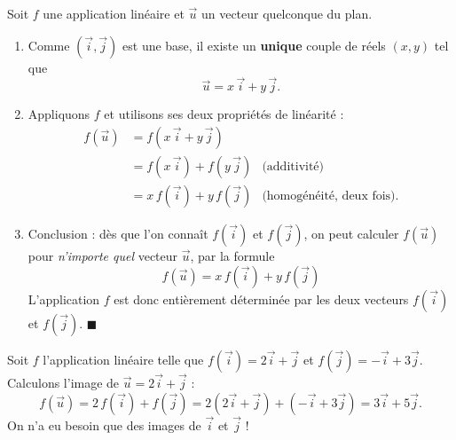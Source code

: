 \documentclass[11pt]{article}
\begin{document}
\begin{experience}
Soit $f$ une application linéaire et $\vec{u}$ un vecteur quelconque du plan.
\begin{enumerate}
\item Comme $(\vec{i},\vec{j})$ est une base, il existe un \textbf{unique} couple de réels $(x,y)$ tel que
\[ \vec{u} = x\,\vec{i} + y\,\vec{j}. \]
\item Appliquons $f$ et utilisons ses deux propriétés de linéarité :
\begin{align*}
f(\vec{u}) &= f(x\,\vec{i} + y\,\vec{j}) \\
&= f(x\,\vec{i}) + f(y\,\vec{j}) & \text{(additivité)}\\
&= x\,f(\vec{i}) + y\,f(\vec{j}) & \text{(homogénéité, deux fois)}.
\end{align*}
\item Conclusion : dès que l'on connaît $f(\vec{i})$ et $f(\vec{j})$, on peut calculer $f(\vec{u})$ pour \emph{n'importe quel} vecteur $\vec{u}$, par la formule
\[ \boxed{\;f(\vec{u}) = x\,f(\vec{i}) + y\,f(\vec{j})\;} \]
L'application $f$ est donc entièrement déterminée par les deux vecteurs $f(\vec{i})$ et $f(\vec{j})$. $\blacksquare$
\end{enumerate}
\end{experience}

\begin{exemplebox}
Soit $f$ l'application linéaire telle que $f(\vec{i}) = 2\vec{i}+\vec{j}$ et $f(\vec{j}) = -\vec{i}+3\vec{j}$. Calculons l'image de $\vec{u} = 2\vec{i}+\vec{j}$ :
\[ f(\vec{u}) = 2\,f(\vec{i}) + f(\vec{j}) = 2(2\vec{i}+\vec{j}) + (-\vec{i}+3\vec{j}) = 3\vec{i}+5\vec{j}. \]
On n'a eu besoin que des images de $\vec{i}$ et $\vec{j}$ !
\end{exemplebox}
\end{document}
